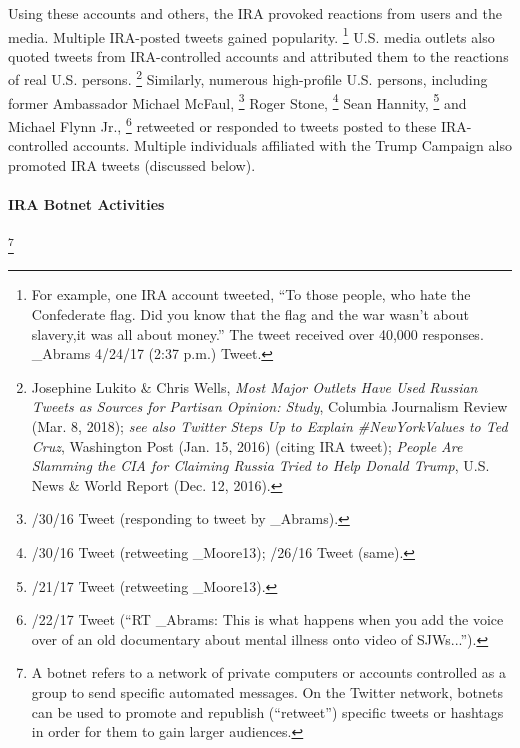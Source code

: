 Using these accounts and others, the IRA provoked reactions from users and the media.
Multiple IRA-posted tweets gained popularity.%
\footnote{For example, one IRA account tweeted, “To those people, who hate the Confederate flag.
Did you know that the flag and the war wasn't about slavery,it was all about money.”
The tweet received over 40,000 responses.
\@Jenn\_Abrams 4/24/17 (2:37 p.m.) Tweet.}
U.S. media outlets also quoted tweets from IRA-controlled accounts and attributed them to the reactions of real U.S. persons.%
\footnote{Josephine Lukito \& Chris Wells, \textit{Most Major Outlets Have Used Russian Tweets as Sources for Partisan Opinion: Study}, Columbia Journalism Review (Mar. 8, 2018);
\textit{see also Twitter Steps Up to Explain \#NewYorkValues to Ted Cruz}, Washington Post (Jan. 15, 2016) (citing IRA tweet);
\textit{People Are Slamming the CIA for Claiming Russia Tried to Help Donald Trump}, U.S. News \& World Report (Dec. 12, 2016).}
Similarly, numerous high-profile U.S. persons, including former Ambassador Michael McFaul,%
\footnote{/30/16 Tweet (responding to tweet by \@Jenn\_Abrams).} Roger Stone,%
\footnote{/30/16 Tweet (retweeting \@Pamela\_Moore13);
/26/16 Tweet (same).}
Sean Hannity,%
\footnote{/21/17 Tweet (retweeting \@Pamela\_Moore13).}
and Michael Flynn Jr.,%
\footnote{/22/17 Tweet (“RT \@Jenn\_Abrams: This is what happens when you add the voice over of an old documentary about mental illness onto video of SJWs...”).}
retweeted or responded to tweets posted to these IRA-controlled accounts.
Multiple individuals affiliated with the Trump Campaign also promoted IRA tweets (discussed below).

\paragraph{IRA Botnet Activities}

\footnote{A botnet refers to a network of private computers or accounts controlled as a group to send specific automated messages.
On the Twitter network, botnets can be used to promote and republish (“retweet”) specific tweets or hashtags in order for them to gain larger audiences.}

